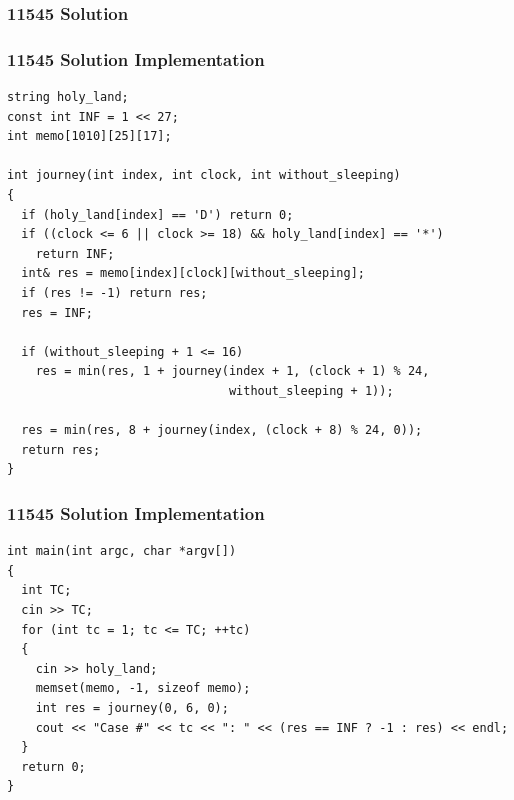 \documentclass{beamer}
\newcommand{\uvalink}[2]{UVa Online Judge (http://uva.onlinejudge.org)
  problem number \href{#2}{\textcolor{blue}{#1}.}}
\newcounter{exo}
\newcommand{\exo}{
  \addtocounter{exo}{1}
  Exercice \arabic{exo}
}
\begin{document}
\fi


\ifanswers

\begin{frame}%
\frametitle{11545 Solution}

\end{frame}

\begin{frame}[fragile]
\frametitle{11545 Solution Implementation}

\scriptsize
\begin{lstlisting}
string holy_land;
const int INF = 1 << 27;
int memo[1010][25][17];

int journey(int index, int clock, int without_sleeping)
{
  if (holy_land[index] == 'D') return 0;
  if ((clock <= 6 || clock >= 18) && holy_land[index] == '*')
    return INF;
  int& res = memo[index][clock][without_sleeping];
  if (res != -1) return res;
  res = INF;

  if (without_sleeping + 1 <= 16)
    res = min(res, 1 + journey(index + 1, (clock + 1) % 24,
                               without_sleeping + 1));

  res = min(res, 8 + journey(index, (clock + 8) % 24, 0));
  return res;
}
\end{lstlisting}

\end{frame}

\begin{frame}[fragile]
\frametitle{11545 Solution Implementation}

\scriptsize
\begin{lstlisting}
int main(int argc, char *argv[])
{
  int TC;
  cin >> TC;
  for (int tc = 1; tc <= TC; ++tc)
  {
    cin >> holy_land;
    memset(memo, -1, sizeof memo);
    int res = journey(0, 6, 0);
    cout << "Case #" << tc << ": " << (res == INF ? -1 : res) << endl;
  }
  return 0;
}
\end{lstlisting}

\end{frame}

\fi

\end{document}
